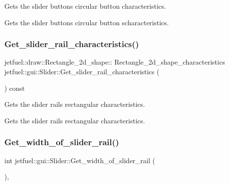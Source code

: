 Gets the slider button\textquotesingle{}s circular button characteristics. 

Gets the slider button\textquotesingle{}s circular button scharacteristics. \mbox{\label{classjetfuel_1_1gui_1_1Slider_aa7ca69b0cac43c29a9df8b2215c073bc}} 
\subsubsection{\texorpdfstring{Get\+\_\+slider\+\_\+rail\+\_\+characteristics()}{Get\_slider\_rail\_characteristics()}}
{\footnotesize\ttfamily jetfuel\+::draw\+::\+Rectangle\+\_\+2d\+\_\+shape\+:: Rectangle\+\_\+2d\+\_\+shape\+\_\+characteristics jetfuel\+::gui\+::\+Slider\+::\+Get\+\_\+slider\+\_\+rail\+\_\+characteristics (\begin{DoxyParamCaption}{ }\end{DoxyParamCaption}) const\hspace{0.3cm}{\ttfamily [inline]}}



Gets the slider rail\textquotesingle{}s rectangular characteristics. 

Gets the slider rail\textquotesingle{}s rectangular characteristics. \mbox{\label{classjetfuel_1_1gui_1_1Slider_a4115f54db7955a6493661ec176b532fd}} 
\subsubsection{\texorpdfstring{Get\+\_\+width\+\_\+of\+\_\+slider\+\_\+rail()}{Get\_width\_of\_slider\_rail()}}
{\footnotesize\ttfamily int jetfuel\+::gui\+::\+Slider\+::\+Get\+\_\+width\+\_\+of\+\_\+slider\+\_\+rail (\begin{DoxyParamCaption}{ }\end{DoxyParamCaption})\hspace{0.3cm}{\ttfamily [inline]}, {\ttfamily [protected]}}




